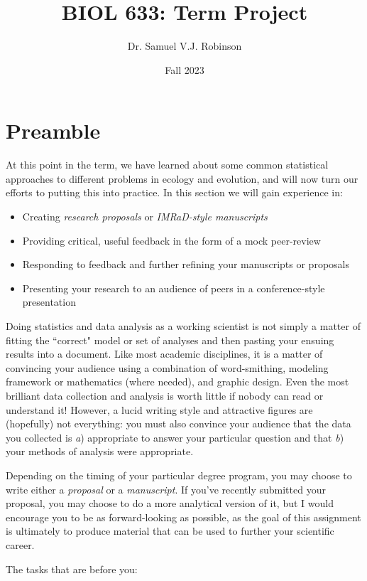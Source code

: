 \documentclass[11pt]{article}
\title{BIOL 633: Term Project}
\author{Dr. Samuel V.J. Robinson}
\date{Fall 2023}
\begin{document}
\maketitle

\section*{Preamble}

\large
At this point in the term, we have learned about some common statistical approaches to different problems in ecology and evolution, and will now turn our efforts to putting this into practice. In this section we will gain experience in: 

\begin{itemize}
\item Creating \emph{research proposals} or \emph{IMRaD-style manuscripts} 
\item Providing critical, useful feedback in the form of a mock peer-review
\item Responding to feedback and further refining your manuscripts or proposals
\item Presenting your research to an audience of peers in a conference-style presentation
\end{itemize}

Doing statistics and data analysis as a working scientist is not simply a matter of fitting the ``correct" model or set of analyses and then pasting your ensuing results into a document. Like most academic disciplines, it is a matter of convincing your audience using a combination of word-smithing, modeling framework or mathematics (where needed), and graphic design. Even the most brilliant data collection and analysis is worth little if nobody can read or understand it! However, a lucid writing style and attractive figures are (hopefully) not everything: you must also convince your audience that the data you collected is \emph{a}) appropriate to answer your particular question and that \emph{b}) your methods of analysis were appropriate.

Depending on the timing of your particular degree program, you may choose to write either a \emph{proposal} or a \emph{manuscript}. If you've recently submitted your proposal, you may choose to do a more analytical version of it, but I would encourage you to be as forward-looking as possible, as the goal of this assignment is ultimately to produce material that can be used to further your scientific career.

The tasks that are before you:
\end{document}
